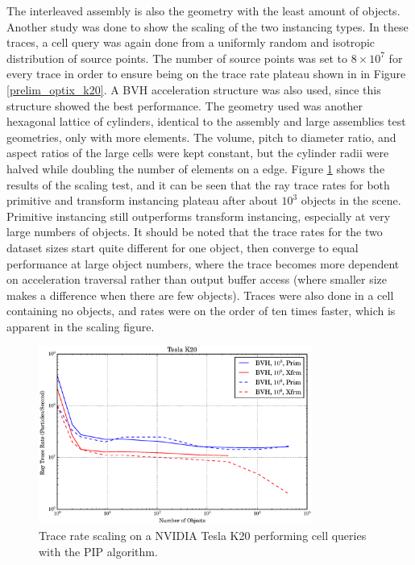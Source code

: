 The interleaved assembly is also the geometry with the least amount of objects.  Another study was done to show the scaling of the two instancing types.  In these traces, a cell query was again done from a uniformly random and isotropic distribution of source points.  The number of source points was set to $8\times10^7$ for every trace in order to ensure being on the trace rate plateau shown in in Figure \ref{prelim_optix_k20}.  A BVH acceleration structure was also used, since this structure showed the best performance.  The geometry used was another hexagonal lattice of cylinders, identical to the assembly and large assemblies test geometries, only with more elements.  The volume, pitch to diameter ratio, and aspect ratios of the large cells were kept constant, but the cylinder radii were halved while doubling the number of elements on a edge.  Figure \ref{prelim_optix_scaling} shows the results of the scaling test, and it can be seen that the ray trace rates for both primitive and transform instancing plateau after about $10^3$ objects in the scene.  Primitive instancing still outperforms transform instancing, especially at very large numbers of objects.  It should be noted that the trace rates for the two dataset sizes start quite different for one object, then converge to equal performance at large object numbers, where the trace becomes more dependent on acceleration traversal rather than output buffer access (where smaller size makes a difference when there are few objects).  Traces were also done in a cell containing no objects, and rates were on the order of ten times faster, which is apparent in the scaling figure.

\begin{figure}[h!] 
  \centering
    \includegraphics[width=0.8\textwidth]{graphics/prelim_optix_scaling.eps}
     \caption{Trace rate scaling on a NVIDIA Tesla K20 performing cell queries with the PIP algorithm. \label{prelim_optix_scaling} }
\end{figure}

